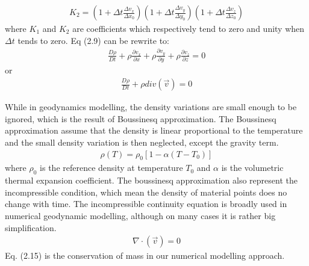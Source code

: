 \begin{align}
K_2=(1+\Delta t\frac{\Delta v_x}{\Delta x_0})(1+\Delta t\frac{\Delta v_y}{\Delta y_0})(1+\Delta t\frac{\Delta v_z}{\Delta z_0})
\end{align}
where $K_1$ and $K_2$ are coefficients which respectively tend to zero and unity when $\Delta t$ tends to zero. Eq (2.9) can be rewrite to:
\begin{align}
\frac{D\rho}{Dt}+\rho\frac{\partial v_x}{\partial x}+\rho\frac{\partial v_y}{\partial y}+\rho\frac{\partial v_z}{\partial z} = 0
\end{align}
or
\begin{align}
\frac{D\rho}{Dt}+\rho div(\vec v) = 0
\end{align}

While in geodynamics modelling, the density variations are small enough to be ignored, which is the result of Boussinesq approximation. The Boussinesq approximation assume that the density is linear proportional to the temperature and the small density variation is then neglected, except the gravity term.
\begin{align}
\rho (T) = \rho_0[1-\alpha (T-T_0)] 
\end{align}
where $\rho_0$ is the reference density at temperature $T_0$ and $\alpha$ is the volumetric thermal expansion coefficient. The boussinesq approximation also represent the incompressible condition, which mean the density of material points does no change with time. The incompressible continuity equation is broadly used in numerical geodynamic modelling, although on many cases it is rather big simplification. 
\begin{align}
\nabla \cdot (\vec v) = 0 
\end{align}
Eq. (2.15) is the conservation of mass in our numerical modelling approach.

